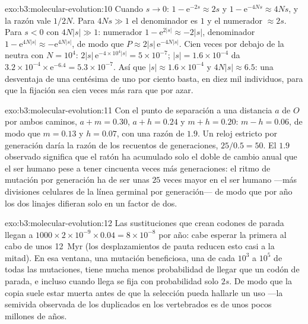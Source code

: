 \begin{solution}{exo:b3:molecular-evolution:10}
Cuando $s \to 0$: $1 - \mathrm{e}^{-2s} \approx 2s$ y $1 - \mathrm{e}^{-4Ns}
\approx 4Ns$, y la razón vale $1/2N$. Para $4Ns \gg 1$ el denominador es
$1$ y el numerador $\approx 2s$. Para $s < 0$ con $4N|s| \gg 1$:
numerador $1 -
\mathrm{e}^{2|s|} \approx -2|s|$, denominador $1 - \mathrm{e}^{4N|s|} \approx
-\mathrm{e}^{4N|s|}$, de modo que $P \approx 2|s|\,\mathrm{e}^{-4N|s|}$. Cien
veces por debajo de la neutra con $N = 10^{4}$: $2|s|\,\mathrm{e}^{-4\times 10^{4}|s|} =
5\times 10^{-7}$; $|s| = 1.6\times 10^{-4}$ da $3.2\times 10^{-4}\times
\mathrm{e}^{-6.4} = 5.3\times 10^{-7}$. Así que $|s| \approx 1.6\times 10^{-4}$
y $4N|s| \approx 6.5$: una desventaja de una centésima de uno por
ciento basta, en diez mil individuos, para que la fijación sea cien
veces más rara que por azar.
\end{solution}

\begin{solution}{exo:b3:molecular-evolution:11}
Con el punto de separación a una distancia $a$ de $O$ por ambos
caminos, $a + m =
0.30$, $a + h = 0.24$ y $m + h = 0.20$: $m - h = 0.06$, de modo que
$m = 0.13$ y $h
= 0.07$, con una razón de $1.9$. Un reloj estricto por generación daría
la razón de los recuentos de generaciones, $25/0.5 = 50$. El $1.9$
observado significa que el ratón ha acumulado solo el doble de cambio
anual que el ser humano pese a tener cincuenta veces más generaciones:
el ritmo de mutación por generación ha de ser unas $25$ veces mayor en
el ser humano ---más divisiones celulares de la línea germinal por
generación--- de modo que por año los dos linajes difieran solo en un
factor de dos.
\end{solution}

\begin{solution}{exo:b3:molecular-evolution:12}
Las sustituciones que crean codones de parada llegan a $1000\times 2\times 10^{-9}\times
0.04 = 8\times 10^{-8}$ por año: cabe esperar la primera al cabo de unos
\qty{12}{Myr} (los desplazamientos de pauta reducen esto casi a la
mitad). En esa ventana, una mutación beneficiosa, una de cada $10^{3}$ a
$10^{5}$ de todas las mutaciones, tiene mucha menos probabilidad de
llegar que un codón de parada, e incluso cuando llega se fija con
probabilidad solo $2s$. De modo que la copia suele estar muerta antes de
que la selección pueda hallarle un uso ---la semivida observada de los
duplicados en los vertebrados es de unos pocos millones de años.
\end{solution}

